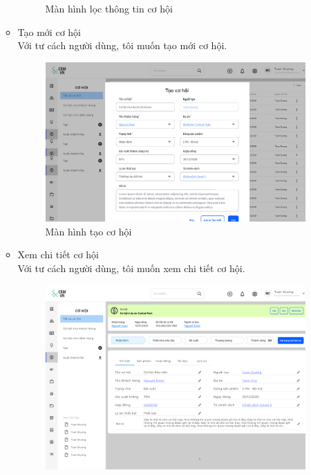 \documentclass[12pt,a4paper]{article}
\begin{document}
\begin{enumerate}
\begin{itemize}
\begin{figure}[H]
                \vspace{0.5cm}
                \caption{Màn hình lọc thông tin cơ hội }
                \label{loccohoi}
            \end{figure}
            \item Tạo mới cơ hội \\
            Với tư cách người dùng, tôi muốn tạo mới cơ hội.
            \begin{figure}[H]
                \centering \includegraphics[width=\textwidth]{Img/Nguyet/Cohoi/taocohoi.png}
                \vspace{0.5cm}
                \caption{Màn hình tạo cơ hội }
                \label{taocohoii}
            \end{figure}
            \item Xem chi tiết cơ hội \\
            Với tư cách người dùng, tôi muốn xem chi tiết cơ hội.
            \begin{figure}[H]
                \centering \includegraphics[width=\textwidth]{Img/Nguyet/Cohoi/chitietcohoi.png}

\end{figure}
\end{itemize}
\end{enumerate}
\end{document}
